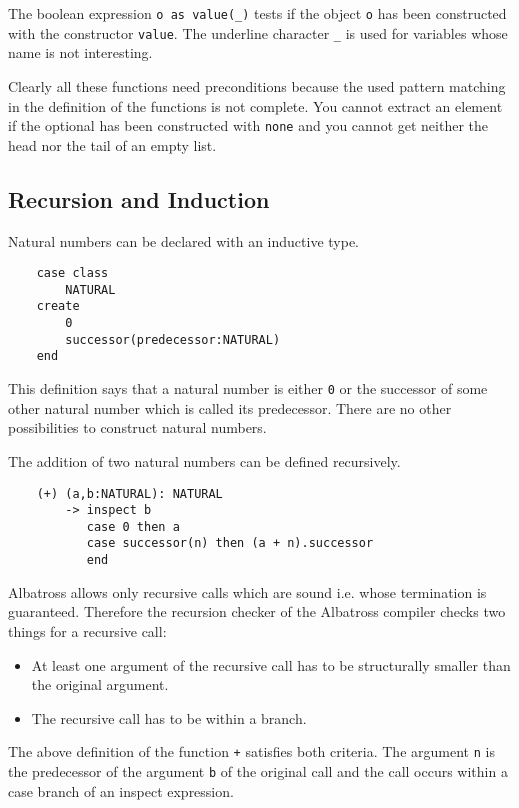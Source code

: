 The boolean expression \lstinline!o as value(_)! tests if the object
\lstinline!o! has been constructed with the constructor \lstinline!value!. The
underline character \lstinline!_! is used for variables whose name is not
interesting.

Clearly all these functions need preconditions because the used pattern
matching in the definition of the functions is not complete. You cannot
extract an element if the optional has been constructed with \lstinline!none!
and you cannot get neither the head nor the tail of an empty list.





\subsection{Recursion and Induction}


Natural numbers can be declared with an inductive type.

\begin{lstlisting}
    case class
        NATURAL
    create
        0
        successor(predecessor:NATURAL)
    end
\end{lstlisting}

This definition says that a natural number is either \lstinline!0! or the
successor of some other natural number which is called its predecessor. There
are no other possibilities to construct natural numbers.

The addition of two natural numbers can be defined recursively.

\begin{lstlisting}
    (+) (a,b:NATURAL): NATURAL
        -> inspect b
           case 0 then a
           case successor(n) then (a + n).successor
           end
\end{lstlisting}


Albatross allows only recursive calls which are sound i.e. whose termination
is guaranteed. Therefore the recursion checker of the Albatross compiler
checks two things for a recursive call:

\begin{itemize}
\item At least one argument of the recursive call has to be structurally
  smaller than the original argument.
\item The recursive call has to be within a branch.
\end{itemize}

The above definition of the function \lstinline!+! satisfies both
criteria. The argument \lstinline!n! is the predecessor of the argument
\lstinline!b! of the original call and the call occurs within a case branch of
an inspect expression.

